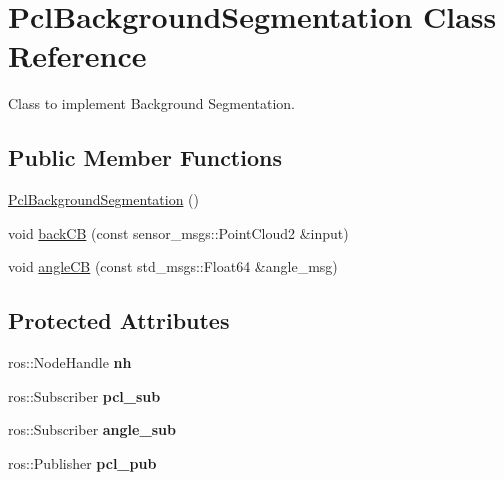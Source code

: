 \hypertarget{classPclBackgroundSegmentation}{}\section{Pcl\+Background\+Segmentation Class Reference}
\label{classPclBackgroundSegmentation}


Class to implement Background Segmentation.  


\subsection*{Public Member Functions}
\begin{DoxyCompactItemize}
\item 
\hyperlink{classPclBackgroundSegmentation_a7e27a18fc9e7e7a0345d2ab0573b60bb}{Pcl\+Background\+Segmentation} ()
\item 
void \hyperlink{classPclBackgroundSegmentation_adc1a5bace5ac90646ff552336564acbc}{back\+CB} (const sensor\+\_\+msgs\+::\+Point\+Cloud2 \&input)
\item 
void \hyperlink{classPclBackgroundSegmentation_a2255df663f6848dc6a59e6d31f058c0b}{angle\+CB} (const std\+\_\+msgs\+::\+Float64 \&angle\+\_\+msg)
\end{DoxyCompactItemize}
\subsection*{Protected Attributes}
\begin{DoxyCompactItemize}
\item 
ros\+::\+Node\+Handle {\bfseries nh}\hypertarget{classPclBackgroundSegmentation_a42e22fca2c30a57d35b09d5077279cca}{}\label{classPclBackgroundSegmentation_a42e22fca2c30a57d35b09d5077279cca}

\item 
ros\+::\+Subscriber {\bfseries pcl\+\_\+sub}\hypertarget{classPclBackgroundSegmentation_a48bba168a2eb4c6521dd77110d71f1f4}{}\label{classPclBackgroundSegmentation_a48bba168a2eb4c6521dd77110d71f1f4}

\item 
ros\+::\+Subscriber {\bfseries angle\+\_\+sub}\hypertarget{classPclBackgroundSegmentation_a4137ec77c2ed7ce6aa01b9ed6ca6891a}{}\label{classPclBackgroundSegmentation_a4137ec77c2ed7ce6aa01b9ed6ca6891a}

\item 
ros\+::\+Publisher {\bfseries pcl\+\_\+pub}\hypertarget{classPclBackgroundSegmentation_a9ac6a20a2cd1c05cb74db86e967bc074}{}\label{classPclBackgroundSegmentation_a9ac6a20a2cd1c05cb74db86e967bc074}

\end{DoxyCompactItemize}


